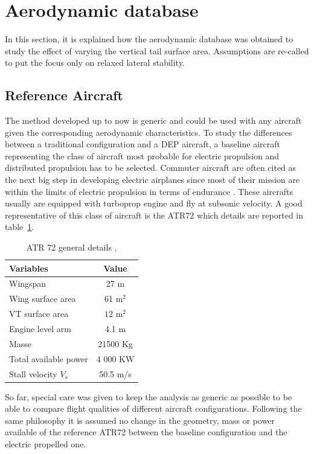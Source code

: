 \section{Aerodynamic database}
In this section, it is explained how the aerodynamic database was obtained to study the effect of varying the vertical tail surface area. Assumptions are re-called to put the focus only on relaxed lateral stability.

\subsection{Reference Aircraft}
The method developed up to now is generic and could be used with any aircraft given the corresponding aerodynamic characteristics. To study the differences between a traditional configuration and a DEP aircraft, a baseline aircraft representing the class of aircraft most probable for electric propulsion and distributed propulsion has to be selected. Commuter aircraft are often cited as the next big step in developing electric airplanes since most of their mission are within the limits of electric propulsion in terms of endurance \cite{MisconceptionMoore} \cite{StucklMethodsDesignElectriProp}. These aircrafts usually are equipped with turboprop engine and fly at subsonic velocity. A good representative of this class of aircraft is the ATR72 which details are reported in table~\ref{tab:nominalset}.

\begin{table}[hbt!]
	\caption{\label{tab:nominalset} ATR 72 general details \cite{ATRFAAtypecertificate}, \cite{JanesAircraft}}
	\centering
	\begin{tabular}{l|c}
		Variables & Value\\
		\hline
		Wingspan & 27 m\\
		Wing surface area & 61 m$^2$\\ 
		VT surface area & $12$ $\textrm{m}^2$\\
		Engine level arm & 4.1 m\\
		Masse & 21500 Kg\\
		Total available power & 4 000 KW\\
		Stall velocity $V_s$ & 50.5 m/s\\
	\end{tabular}
\end{table}

So far, special care was given to keep the analysis as generic as possible to be able to compare flight qualities of different aircraft configurations. Following the same philosophy it is assumed no change in the geometry, mass or power available of the reference ATR72 between the baseline configuration and the electric propelled one.

